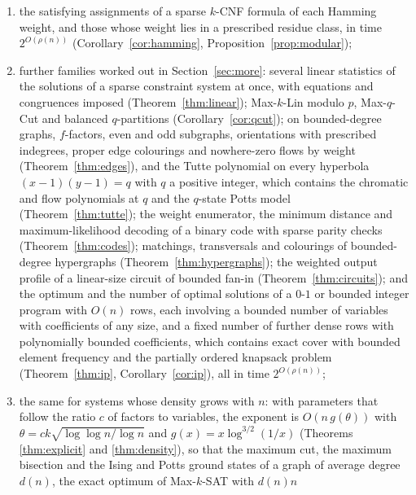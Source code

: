 \documentclass[11pt,reqno]{amsart}
\numberwithin{equation}{section}
\theoremstyle{plain}
\theoremstyle{definition}
\theoremstyle{remark}
\newcommand{\rhon}{\rho}
\begin{document}
\begin{enumerate}[label=(\roman*),leftmargin=2.2em]
system over a finite domain, hence every partition function $Z_A(G)$ of a
fixed symmetric rational matrix $A$ and the number of homomorphisms into a
fixed graph, on bounded-degree graphs, in time $2^{O(\rhon(n))}$
(Theorem~\ref{thm:domain}, Corollary~\ref{cor:hom});
\item\label{it:global} the satisfying assignments of a sparse $k$-CNF formula
of each Hamming weight, and those whose weight lies in a prescribed residue
class, in time $2^{O(\rhon(n))}$ (Corollary~\ref{cor:hamming},
Proposition~\ref{prop:modular});
\item\label{it:more} further families worked out in Section~\ref{sec:more}:
several linear statistics of the solutions of a sparse constraint system at
once, with equations and congruences imposed (Theorem~\ref{thm:linear});
Max-$k$-Lin modulo $p$, Max-$q$-Cut and balanced $q$-partitions
(Corollary~\ref{cor:qcut}); on bounded-degree graphs, $f$-factors, even and
odd subgraphs, orientations with prescribed indegrees, proper edge colourings
and nowhere-zero flows by weight (Theorem~\ref{thm:edges}), and the Tutte
polynomial on every hyperbola $(x-1)(y-1)=q$ with $q$ a positive integer,
which contains the chromatic and flow polynomials at $q$ and the $q$-state
Potts model (Theorem~\ref{thm:tutte}); the weight enumerator, the minimum
distance and maximum-likelihood decoding of a binary code with sparse parity
checks (Theorem~\ref{thm:codes}); matchings, transversals and colourings of
bounded-degree hypergraphs (Theorem~\ref{thm:hypergraphs}); the weighted
output profile of a linear-size circuit of bounded fan-in
(Theorem~\ref{thm:circuits}); and the optimum and the number of optimal
solutions of a $0$-$1$ or bounded integer program with $O(n)$ rows, each
involving a bounded number of variables with coefficients of any size, and a
fixed number of further dense rows with polynomially bounded coefficients,
which contains exact cover with bounded element frequency and the partially
ordered knapsack problem (Theorem~\ref{thm:ip}, Corollary~\ref{cor:ip}), all
in time $2^{O(\rhon(n))}$;
\item\label{it:density} the same for systems whose density grows with $n$:
with parameters that follow the ratio $c$ of factors to variables, the exponent
is $O(n\,g(\theta))$ with $\theta=ck\sqrt{\log\log n/\log n}$ and
$g(x)=x\log^{3/2}(1/x)$ (Theorems \ref{thm:explicit} and \ref{thm:density}), so
that the maximum cut, the maximum bisection and the Ising and Potts ground states
of a graph of average degree $d(n)$, the exact optimum of Max-$k$-SAT with $d(n)n$

\end{enumerate}
\end{document}

